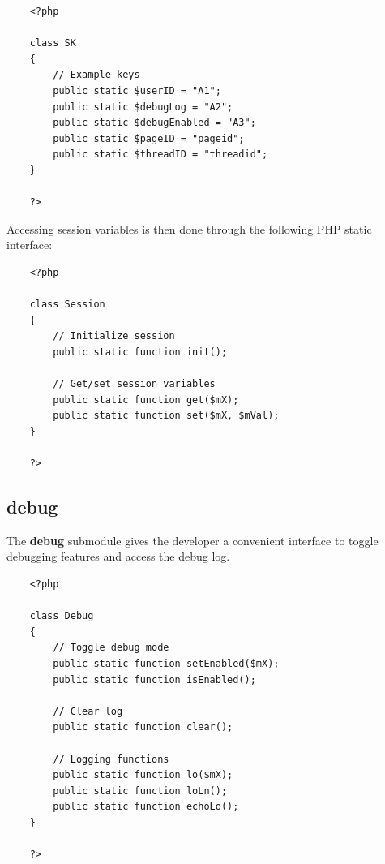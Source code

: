 \documentclass[12pt]{report}
\renewcommand\emph{\textbf}
\begin{document}
                    \begin{verbatim}
    <?php

    class SK
    {
        // Example keys
        public static $userID = "A1";
        public static $debugLog = "A2";
        public static $debugEnabled = "A3";
        public static $pageID = "pageid";
        public static $threadID = "threadid";
    }

    ?>
                    \end{verbatim}

                    Accessing session variables is then done through the following PHP static interface:


                    \begin{verbatim}
    <?php

    class Session
    {
        // Initialize session
        public static function init();

        // Get/set session variables
        public static function get($mX);
        public static function set($mX, $mVal);
    }

    ?>
                    \end{verbatim}

                \subsection{debug}

                    The \emph{debug} submodule gives the developer a convenient interface to toggle debugging features and access the debug log.

                    \begin{verbatim}
    <?php

    class Debug
    {
        // Toggle debug mode
        public static function setEnabled($mX);
        public static function isEnabled();

        // Clear log
        public static function clear();

        // Logging functions
        public static function lo($mX);
        public static function loLn();
        public static function echoLo();
    }

    ?>
                        \end{verbatim}
\end{document}
